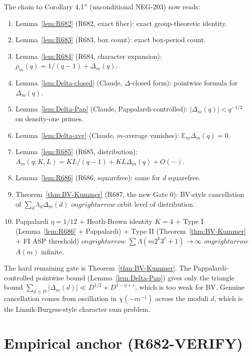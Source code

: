 \documentclass[12pt]{amsart}
\theoremstyle{definition}
\theoremstyle{remark}
\begin{document}
The chain to Corollary 4.1$''$ (unconditional NEG-203) now reads:

\begin{enumerate}
\item Lemma~\ref{lem:R682} (R682, exact fiber): exact group-theoretic identity.
\item Lemma~\ref{lem:R683} (R683, box count): exact box-period count.
\item Lemma~\ref{lem:R684} (R684, character expansion): $\rho_m(q) = 1/(q-1) + \Delta_m(q)$.
\item Lemma~\ref{lem:Delta-closed} (Claude, $\Delta$-closed form): pointwise formula for $\Delta_m(q)$.
\item Lemma~\ref{lem:Delta-Pap} (Claude, Pappalardi-controlled): $|\Delta_m(q)| < q^{-1/2}$ on density-one primes.
\item Lemma~\ref{lem:Delta-avg} (Claude, $m$-average vanishes): $\mathbb{E}_m \Delta_m(q) = 0$.
\item Lemma~\ref{lem:R685} (R685, distribution): $A_m(q; K, L) = KL/(q-1) + KL \Delta_m(q) + O(\cdots)$.
\item Lemma~\ref{lem:R686} (R686, squarefree): same for $d$ squarefree.
\item Theorem~\ref{thm:BV-Kummer} (R687, the new Gate 0): BV-style cancellation of $\sum_d \lambda_d \Delta_m(d)$ $ongrightarrow$ orbit level of distribution.
\item Pappalardi $\eta = 1/12$ + Heath-Brown identity $K = 4$ + Type I (Lemma~\ref{lem:R686} + Pappalardi) + Type II (Theorem~\ref{thm:BV-Kummer} + FI ASP threshold) $ongrightarrow$ $\sum \Lambda(m 2^k 3^\ell + 1) \to \infty$ $ongrightarrow$ $A(m)$ infinite.
\end{enumerate}

The hard remaining gate is Theorem~\ref{thm:BV-Kummer}. The Pappalardi-controlled pointwise
bound (Lemma~\ref{lem:Delta-Pap}) gives only the triangle bound
$\sum_{d \le D} |\Delta_m(d)| \ll D^{1/2} + D^{1-\eta+\varepsilon}$, which is too weak for BV.
Genuine cancellation comes from oscillation in $\chi(-m^{-1})$ across the moduli $d$, which
is the Linnik-Burgess-style character sum problem.

\section{Empirical anchor (R682-VERIFY)}
\end{document}
